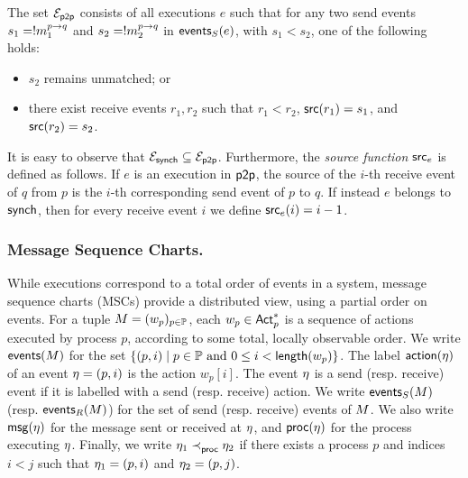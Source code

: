\bigskip

\begin{definition}
\label{def:queue-based-communication-model}
The set $\executionsofmodel{\ppmodel}$ consists of all executions $e$ 
such that for any two send events 
$s_1=\send{p}{q}{\msg_1}$ and $s_2=\send{p}{q}{\msg_2}$ in 
$\sendeventsof{e}$, with $s_1 < s_2$, one of the following holds:
\begin{itemize}
    \item $s_2$ remains unmatched; or
    \item there exist receive events $r_1, r_2$ such that $r_1 < r_2$, 
          $\source(r_1)=s_1$, and $\source(r_2)=s_2$.
\end{itemize}
\end{definition}

It is easy to observe that 
$\executionsofmodel{\synchmodel} \subseteq \executionsofmodel{\ppmodel}$.  
Furthermore, the \emph{source function} $\source_e$ is defined as follows.  
If $e$ is an execution in $\ppmodel$, the source of the $i$-th receive 
event of $q$ from $p$ is the $i$-th corresponding send event of $p$ to $q$.  
If instead $e$ belongs to $\synchmodel$, then for every receive event $i$ 
we define $\source_e(i) = i-1$.  

\subsubsection*{Message Sequence Charts.}
While executions correspond to a total order of events in a system,  
message sequence charts (MSCs) provide a distributed view, using  
a partial order on events.  
For a tuple $\mmsc=(w_p)_{p\in\Procs}$, each $w_p \in \Actsp$ is a  
sequence of actions executed by process $p$, according to some  
total, locally observable order.  
We write $\eventsof{\mmsc}$ for the set  
$\{(p,i) \mid p \in \Procs \text{ and } 0 \leq i < \length{w_p}\}$.  
The label $\actionof{\event}$ of an event $\event=(p,i)$ is the action  
$w_p[i]$. The event $\event$ is a send (resp. receive) event if it is  
labelled with a send (resp. receive) action.  
We write $\sendeventsof{\mmsc}$ (resp. $\receiveeventsof{\mmsc}$)  
for the set of send (resp. receive) events of $\mmsc$. We also write  
$\messageof{\event}$ for the message sent or received at $\event$, and  
$\processof{\event}$ for the process executing $\event$.  
Finally, we write $\verticalorderstrict{\event_1}{\event_2}$ if there  
exists a process $p$ and indices $i<j$ such that  
$\event_1=(p,i)$ and $\event_2=(p,j)$.  


